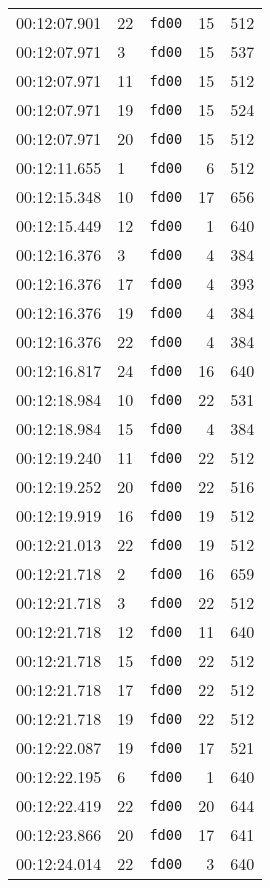 \documentclass{article}
\begin{document}
\begin{longtable}{lllrr}
00:12:07.901 & 22 & \texttt{fd00} & 15 & 512 \\
00:12:07.971 & 3 & \texttt{fd00} & 15 & 537 \\
00:12:07.971 & 11 & \texttt{fd00} & 15 & 512 \\
00:12:07.971 & 19 & \texttt{fd00} & 15 & 524 \\
00:12:07.971 & 20 & \texttt{fd00} & 15 & 512 \\
00:12:11.655 & 1 & \texttt{fd00} & 6 & 512 \\
00:12:15.348 & 10 & \texttt{fd00} & 17 & 656 \\
00:12:15.449 & 12 & \texttt{fd00} & 1 & 640 \\
00:12:16.376 & 3 & \texttt{fd00} & 4 & 384 \\
00:12:16.376 & 17 & \texttt{fd00} & 4 & 393 \\
00:12:16.376 & 19 & \texttt{fd00} & 4 & 384 \\
00:12:16.376 & 22 & \texttt{fd00} & 4 & 384 \\
00:12:16.817 & 24 & \texttt{fd00} & 16 & 640 \\
00:12:18.984 & 10 & \texttt{fd00} & 22 & 531 \\
00:12:18.984 & 15 & \texttt{fd00} & 4 & 384 \\
00:12:19.240 & 11 & \texttt{fd00} & 22 & 512 \\
00:12:19.252 & 20 & \texttt{fd00} & 22 & 516 \\
00:12:19.919 & 16 & \texttt{fd00} & 19 & 512 \\
00:12:21.013 & 22 & \texttt{fd00} & 19 & 512 \\
00:12:21.718 & 2 & \texttt{fd00} & 16 & 659 \\
00:12:21.718 & 3 & \texttt{fd00} & 22 & 512 \\
00:12:21.718 & 12 & \texttt{fd00} & 11 & 640 \\
00:12:21.718 & 15 & \texttt{fd00} & 22 & 512 \\
00:12:21.718 & 17 & \texttt{fd00} & 22 & 512 \\
00:12:21.718 & 19 & \texttt{fd00} & 22 & 512 \\
00:12:22.087 & 19 & \texttt{fd00} & 17 & 521 \\
00:12:22.195 & 6 & \texttt{fd00} & 1 & 640 \\
00:12:22.419 & 22 & \texttt{fd00} & 20 & 644 \\
00:12:23.866 & 20 & \texttt{fd00} & 17 & 641 \\
00:12:24.014 & 22 & \texttt{fd00} & 3 & 640 \\

\end{longtable}
\end{document}

